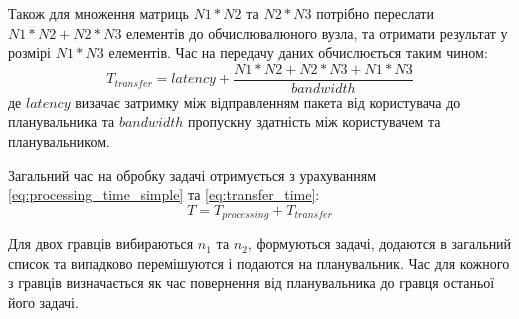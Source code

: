 Також для множення матриць $N1*N2$ та $N2*N3$ потрібно переслати $N1*N2 + N2*N3$ елементів до обчислювалюного вузла, та отримати результат у розмірі $N1*N3$ елементів. Час на передачу даних обчислюється таким чином:
\begin{equation}
\label{eq:transfer_time}
T_{transfer} = latency + \frac{N1*N2+N2*N3+N1*N3}{bandwidth}
\end{equation}
де $latency$ визачає затримку між відправленням пакета від користувача до планувальника та $bandwidth$ пропускну здатність між користувачем та планувальником.

Загальний час на обробку задачі отримується з урахуванням \ref{eq:processing_time_simple} та \ref{eq:transfer_time}:
\begin{equation}
\label{eq:total_task_processing_time}
T = T_{processing} + T_{transfer}
\end{equation}

Для двох гравців вибираються $n_1$ та $n_2$, формуються задачі, додаются в загальний список та випадково перемішуются і подаются на планувальник. Час для кожного з гравців визначається як час повернення від планувальника до гравця останьої його задачі.
